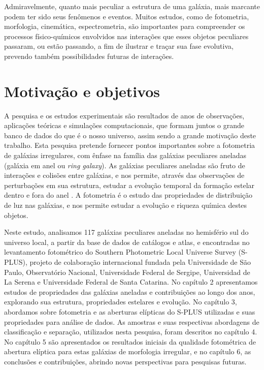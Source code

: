Admiravelmente, quanto mais peculiar a estrutura de uma galáxia, mais marcante podem ter sido seus fenômenos e eventos. Muitos estudos, como de fotometria, morfologia, cinemática, espectrometria, são importantes para compreender os processos físico-químicos envolvidos nas interações que esses objetos peculiares passaram, ou estão passando, a fim de ilustrar e traçar sua fase evolutiva, prevendo também possibilidades futuras de interações.

\section{Motivação e objetivos}

A pesquisa e os estudos experimentais são resultados de anos de observações, aplicações teóricas e simulações computacionais, que formam juntos o grande banco de dados do que é o nosso universo, assim sendo a grande motivação deste trabalho. Esta pesquisa pretende fornecer pontos importantes sobre a fotometria de galáxias irregulares, com ênfase na família das galáxias peculiares aneladas (galáxia em anel ou \emph{ring galaxy}). As galáxias peculiares aneladas são fruto de interações e colisões entre galáxias, e nos permite, através das observações de perturbações em sua estrutura, estudar a evolução temporal da formação estelar dentro e fora do anel \cite{Appleton96}. A fotometria é o estudo das propriedades de distribuição de luz nas galáxias, e nos permite estudar a evolução e riqueza química destes objetos.

Neste estudo, analisamos 117 galáxias peculiares aneladas no hemisfério sul do universo local, a partir da base de dados de catálogos e atlas, e encontradas no levantamento fotométrico do Southern Photometric Local Universe Survey (S-PLUS), projeto de colaboração internacional fundada pela Universidade de São Paulo, Observatório Nacional,
Universidade Federal de Sergipe, Universidad de La Serena e Universidade Federal de Santa Catarina. No capítulo 2 apresentamos estudos de propriedades das galáxias aneladas e contribuições ao longo dos anos, explorando sua estrutura, propriedades estelares e evolução. No capítulo 3, abordamos sobre fotometria e as aberturas elípticas do S-PLUS utilizadas e suas propriedades para análise de dados. As amostras e suas respectivas abordagens de classificação e separação, utilizados nesta pesquisa, foram descritos no capítulo 4. No capítulo 5 são apresentados os resultados iniciais da qualidade fotométrica de abertura elíptica para estas galáxias de morfologia irregular, e no capítulo 6, as conclusões e contribuições, abrindo novas perspectivas para pesquisas futuras.



